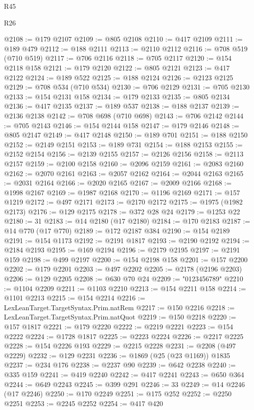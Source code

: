 \begin{lexlean}{R45}
\begin{lexlean}{R26}
\begin{coremodule}
{{{{{{{{{{{{{{{{{{{{{{{{{{{{{{{{{{{{{{{{{{{{{{{{{{{{{{{{{{{{{{{{{{{{{{{{@2108 := @179 @2107
@2109 := @805 @2108
@2110 := @417 @2109
@2111 := @189 @479
@2112 := @188 @2111
@2113 := @2110 @2112
@2116 := @708 @519 (@710 @519)
@2117 := @706 @2116
@2118 := @705 @2117
@2120 := @154 @2118 @158
@2121 := @179 @2120
@2122 := @805 @2121
@2123 := @417 @2122
@2124 := @189 @522
@2125 := @188 @2124
@2126 := @2123 @2125
@2129 := @708 @534 (@710 @534)
@2130 := @706 @2129
@2131 := @705 @2130
@2133 := @154 @2131 @158
@2134 := @179 @2133
@2135 := @805 @2134
@2136 := @417 @2135
@2137 := @189 @537
@2138 := @188 @2137
@2139 := @2136 @2138
@2142 := @708 @698 (@710 @698)
@2143 := @706 @2142
@2144 := @705 @2143
@2146 := @154 @2144 @158
@2147 := @179 @2146
@2148 := @805 @2147
@2149 := @417 @2148
@2150 := @189 @701
@2151 := @188 @2150
@2152 := @2149 @2151
@2153 := @189 @731
@2154 := @188 @2153
@2155 := @2152 @2154
@2156 := @2139 @2155
@2157 := @2126 @2156
@2158 := @2113 @2157
@2159 := @2100 @2158
@2160 := @2096 @2159
@2161 := @2083 @2160
@2162 := @2070 @2161
@2163 := @2057 @2162
@2164 := @2044 @2163
@2165 := @2031 @2164
@2166 := @2020 @2165
@2167 := @2009 @2166
@2168 := @1998 @2167
@2169 := @1987 @2168
@2170 := @1196 @2169
@2171 := @157 @1219
@2172 := @497 @2171
@2173 := @2170 @2172
@2175 := @1975 (@1982 @2173)
@2176 := @129 @2175
@2178 := @372 @28 @24
@2179 := @1253 @22
@2180 := 31
@2183 := @14 @2180 (@17 @2180)
@2184 := @170 @2183
@2187 := @14 @770 (@17 @770)
@2189 := @172 @2187 @384
@2190 := @154 @2189
@2191 := @154 @1173
@2192 := @2191 @1817
@2193 := @2190 @2192
@2194 := @2184 @2193
@2195 := @169 @2194
@2196 := @2179 @2195
@2197 := @2191 @159
@2198 := @499 @2197
@2200 := @154 @2198 @158
@2201 := @157 @2200
@2202 := @179 @2201
@2203 := @497 @2202
@2205 := @2178 (@2196 @2203)
@2206 := @129 @2205
@2208 := @630 @70 @24
@2209 := "0123456789"
@2210 := @1104 @2209
@2211 := @1103 @2210
@2213 := @154 @2211 @158
@2214 := @1101 @2213
@2215 := @154 @2214
@2216 := LexLeanTarget.TargetSyntax.Prim.natRem
@2217 := @150 @2216
@2218 := LexLeanTarget.TargetSyntax.Prim.natQuot
@2219 := @150 @2218
@2220 := @157 @1817
@2221 := @179 @2220
@2222 := @2219 @2221
@2223 := @154 @2222
@2224 := @1728 @1817
@2225 := @2223 @2224
@2226 := @2217 @2225
@2228 := @154 @2226 @193
@2229 := @2215 @2228
@2231 := @2208 (@497 @2229)
@2232 := @129 @2231
@2236 := @1869 (@25 (@23 @1169)) @1835
@2237 := @234 @176
@2238 := @2237 @90
@2239 := @642 @2238
@2240 := @335 @159
@2241 := @419 @2240
@2242 := @417 @2241
@2243 := @650 @364
@2244 := @649 @2243
@2245 := @399 @291
@2246 := 33
@2249 := @14 @2246 (@17 @2246)
@2250 := @170 @2249
@2251 := @175 @252
@2252 := @2250 @2251
@2253 := @2245 @2252
@2254 := @417 @420
}}}}}}}}}}}}}}}}}}}}}}}}}}}}}}}}}}}}}}}}}}}}}}}}}}}}}}}}}}}}}}}}}}}}}}}}
\end{coremodule}
\end{lexlean}
\end{lexlean}

